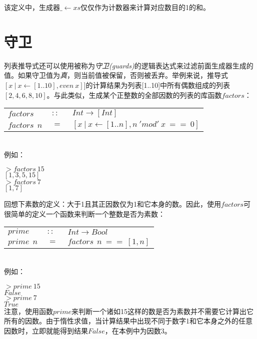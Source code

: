 \noindent 该定义中，生成器$\_\leftarrow xs$仅仅作为计数器来计算对应数目的1的和。
\section{守卫}
列表推导式还可以使用被称为\textit{守卫(guards)}的逻辑表达式来过滤前面生成器生成的值。如果守卫值为\textit{真}，则当前值被保留，否则被丢弃。举例来说，推导式$[x~|~x\leftarrow [1..10], even~x]]$的计算结果为列表[1..10]中所有偶数组成的列表$[2,4,6,8,10]$。与此类似，生成某个正整数的全部因数的列表的库函数$factors$：
\\
  \begin{tabular}[t]{lll}
    $factors$&$~::~$&$Int \rightarrow [Int]$\\
    $factors~~n$&$~=~$&$[x~|~x\leftarrow [1..n], n~'mod'~x~==~0]$\\
  \end{tabular}
\\
\noindent 例如：

\noindent\hspace*{1cm}$>factors~15$\\
\hspace*{1cm}$[1,3,5,15]$
\\
\noindent\hspace*{1cm}$>factors~7$\\
\hspace*{1cm}$[1,7]$

\noindent 回想下素数的定义：大于1且其正因数仅为1和它本身的数。因此，使用$factors$可很简单的定义一个函数来判断一个整数是否为素数：\\
\begin{tabular}[t]{lll}
  $prime$&$~::~$&$Int \rightarrow Bool$\\
  $prime~~n$&$~=~$&$factors~~n~==~[1,n]$
\end{tabular}
\\
\noindent 例如：

\noindent\hspace*{1cm}$>prime~15$\\
\hspace*{1cm}$False$\\

\noindent\hspace*{1cm}$>prime~7$\\
\hspace*{1cm}$True$\\

注意，使用函数$prime$来判断一个诸如15这样的数是否为素数并不需要它计算出它所有的因数。由于惰性求值，当计算结果中出现不同于数字1和它本身之外的任意因数时，立即就能得到结果$False$，在本例中为因数3。

